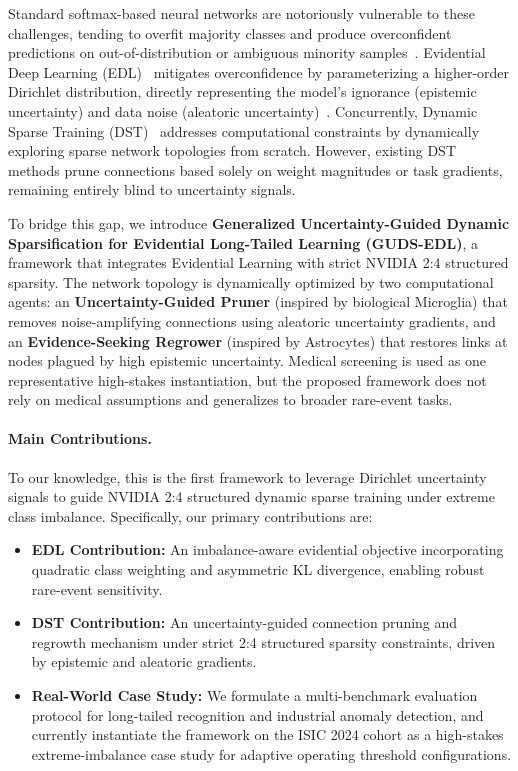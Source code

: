 \documentclass[letterpaper]{article} %
\begin{document}
Standard softmax-based neural networks are notoriously vulnerable to these challenges, tending to overfit majority classes and produce overconfident predictions on out-of-distribution or ambiguous minority samples~\cite{guo2017calibration}. Evidential Deep Learning (EDL)~\cite{sensoy2018evidential} mitigates overconfidence by parameterizing a higher-order Dirichlet distribution, directly representing the model's ignorance (epistemic uncertainty) and data noise (aleatoric uncertainty)~\cite{malinin2018predictive}. Concurrently, Dynamic Sparse Training (DST)~\cite{evci2020rigging} addresses computational constraints by dynamically exploring sparse network topologies from scratch. However, existing DST methods prune connections based solely on weight magnitudes or task gradients, remaining entirely blind to uncertainty signals.

To bridge this gap, we introduce \textbf{Generalized Uncertainty-Guided Dynamic Sparsification for Evidential Long-Tailed Learning (GUDS-EDL)}, a framework that integrates Evidential Learning with strict NVIDIA 2:4 structured sparsity. The network topology is dynamically optimized by two computational agents: an \textbf{Uncertainty-Guided Pruner} (inspired by biological Microglia) that removes noise-amplifying connections using aleatoric uncertainty gradients, and an \textbf{Evidence-Seeking Regrower} (inspired by Astrocytes) that restores links at nodes plagued by high epistemic uncertainty. Medical screening is used as one representative high-stakes instantiation, but the proposed framework does not rely on medical assumptions and generalizes to broader rare-event tasks.

\paragraph{Main Contributions.} To our knowledge, this is the first framework to leverage Dirichlet uncertainty signals to guide NVIDIA 2:4 structured dynamic sparse training under extreme class imbalance. Specifically, our primary contributions are:
\begin{itemize}
    \item \textbf{EDL Contribution:} An imbalance-aware evidential objective incorporating quadratic class weighting and asymmetric KL divergence, enabling robust rare-event sensitivity.
    \item \textbf{DST Contribution:} An uncertainty-guided connection pruning and regrowth mechanism under strict 2:4 structured sparsity constraints, driven by epistemic and aleatoric gradients.
    \item \textbf{Real-World Case Study:} We formulate a multi-benchmark evaluation protocol for long-tailed recognition and industrial anomaly detection, and currently instantiate the framework on the ISIC 2024 cohort as a high-stakes extreme-imbalance case study for adaptive operating threshold configurations.
\end{itemize}
\end{document}
